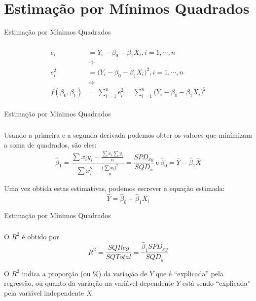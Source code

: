 \documentclass[14pt,aspectratio=1610]{beamer}
\begin{document}
\section{Estimação por Mínimos Quadrados}
\begin{frame}{Estimação por Mínimos Quadrados}
\frametitle{}
\begin{block}{}
\justifying
\begin{align*}
    e_{i}&=Y_{i}-\beta_{0}-\beta_{1}X_{i}, i=1,\cdots,n\\
    &\Rightarrow\\
    e_{i}^{2}&=\Big(Y_{i}-\beta_{0}-\beta_{1}X_{i}\Big)^{2}, i=1,\cdots,n\\
    &\Rightarrow\\
    f(\beta_{0},\beta_{1})&=\displaystyle\sum_{i=1}^{n}e_{i}^{2}=\displaystyle\sum_{i=1}^{n}\Big(Y_{i}-\beta_{0}-\beta_{1}X_{i}\Big)^{2}\\
\end{align*}
\end{block}
\end{frame}

\begin{frame}{Estimação por Mínimos Quadrados}
\frametitle{}
\begin{block}{}
\justifying
Usando a primeira e a segunda derivada podemos obter os valores que minimizam a soma de quadrados, são eles:
\begin{align*}
    \hat{\beta}_{1}=\dfrac{\sum x_{i}y_{i}-\frac{\sum x_{i}\sum y_{i}}{n}}{\sum x_{i}^{2}-\frac{\big(\sum x_{i}\big)^{2}}{n}}=\dfrac{SPD_{xy}}{SQD_{x}}~\textrm{e}~\hat{\beta}_{0}=\bar{Y}-\hat{\beta}_{1}\bar{X}
\end{align*}
\end{block}
\pause
\begin{block}{}
Uma vez obtida estas estimativas, podemos escrever a equação estimada: 
$$\hat{Y}=\hat{\beta}_{0}+\hat{\beta}_{1}X_{i}$$
\end{block}
\end{frame}

\begin{frame}{Estimação por Mínimos Quadrados}
\frametitle{}
\begin{block}{}
\justifying
O $R^{2}$ é obtido por $$R^{2}=\dfrac{SQReg}{SQTotal}=\dfrac{\hat{\beta}_{1}SPD_{xy}}{SQD_{y}}$$
\end{block}
\pause
\begin{block}{}
O $R^{2}$ indica a proporção (ou \%) da variação de $Y$ que é ``explicada'' pela regressão, ou quanto da variação na variável dependente $Y$ está sendo “explicada” pela variável independente $X$.
\end{block}
\end{frame}
\end{document}
